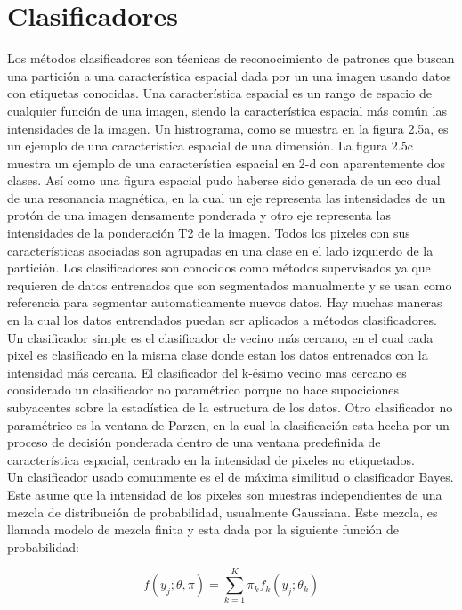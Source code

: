 \documentclass[12pt]{report}
\begin{document}
\section{Clasificadores}
Los métodos clasificadores son técnicas de reconocimiento de patrones que buscan una partición a una característica espacial dada por un una imagen usando datos con etiquetas conocidas.
Una característica espacial es un rango de espacio de cualquier función de una imagen, siendo la característica espacial más común las intensidades de la imagen. Un histrograma, como se muestra en la figura 2.5a, es un ejemplo de una característica espacial de una dimensión. La figura 2.5c muestra un ejemplo de una característica espacial en 2-d con aparentemente dos clases.
Así como una figura espacial pudo haberse sido generada de un eco dual de una resonancia magnética, en la cual un eje representa las intensidades de un protón de una imagen densamente ponderada y otro eje representa las intensidades de la ponderación T2 de la imagen.
Todos los pixeles con sus características asociadas son agrupadas en una clase en el lado izquierdo de la partición.
Los clasificadores son conocidos como métodos supervisados ya que requieren de datos entrenados que son segmentados manualmente y se usan como referencia para segmentar automaticamente nuevos datos.
Hay muchas maneras en la cual los datos entrendados puedan ser aplicados a métodos clasificadores. Un clasificador simple es el clasificador de vecino más cercano, en el cual cada pixel es clasificado en la misma clase donde estan los datos entrenados con la intensidad más cercana. El clasificador del k-ésimo vecino mas cercano es
considerado un clasificador no paramétrico porque no hace supociciones subyacentes sobre la estadística de la estructura de los datos.
Otro clasificador no paramétrico es la ventana de Parzen, en  la cual la clasificación esta hecha por un proceso de decisión ponderada dentro de una ventana predefinida de característica espacial, centrado en la intensidad de pixeles no etiquetados.\\

Un clasificador usado comunmente es el de  máxima similitud o clasificador Bayes. Este asume que la intensidad de los pixeles son muestras independientes de una mezcla de distribución de probabilidad, usualmente Gaussiana. Este mezcla, es llamada modelo de mezcla finita y esta dada por la siguiente función de probabilidad:

\begin{equation} f(y_{j};\theta,\pi) = \sum_{k = 1}^{K} \pi_{k} f_{k} (y_{j} ; \theta_{k}) \end{equation}
\end{document}
